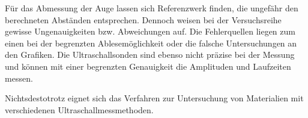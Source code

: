 \begin{flushleft}
    Für das Abmessung der Auge lassen sich Referenzwerk finden, die ungefähr den berechneten Abständen entsprechen.
    Dennoch weisen bei der Versuchsreihe gewisse Ungenauigkeiten bzw. Abweichungen auf.
    Die Fehlerquellen liegen zum einen bei der begrenzten Ablesemöglichkeit oder die falsche Untersuchungen an den Grafiken.
    Die Ultraschallsonden sind ebenso nicht präzise bei der Messung und können mit einer begrenzten Genauigkeit die Amplituden und Laufzeiten messen.
\end{flushleft}

\begin{flushleft}
    Nichtsdestotrotz eignet sich das Verfahren zur Untersuchung von Materialien mit verschiedenen Ultraschallmessmethoden.
\end{flushleft}